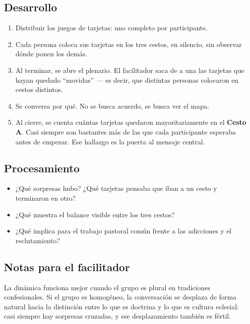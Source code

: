 \documentclass[11pt, a4paper]{article}
\begin{document}
\begin{actividad}
\subsection*{Desarrollo}
\begin{enumerate}[label={\arabic*.}]
  \item Distribuir los juegos de tarjetas: uno completo por participante.
  \item Cada persona coloca sus tarjetas en los tres cestos, en silencio, sin observar dónde ponen los demás.
  \item Al terminar, se abre el plenario. El facilitador saca de a una las tarjetas que hayan quedado ``movidas'' \emph{---} es decir, que distintas personas colocaron en cestos distintos.
  \item Se conversa por qué. No se busca acuerdo, se busca ver el mapa.
  \item Al cierre, se cuenta cuántas tarjetas quedaron mayoritariamente en el \textbf{Cesto A}. Casi siempre son bastantes más de las que cada participante esperaba antes de empezar. Ese hallazgo es la puerta al mensaje central.
\end{enumerate}

\subsection*{Procesamiento}
\begin{itemize}
  \item ¿Qué sorpresas hubo? ¿Qué tarjetas pensaba que iban a un cesto y terminaron en otro?
  \item ¿Qué muestra el balance visible entre los tres cestos?
  \item ¿Qué implica para el trabajo pastoral común frente a las adicciones y el reclutamiento?
\end{itemize}

\subsection*{Notas para el facilitador}
La dinámica funciona mejor cuando el grupo es plural en tradiciones confesionales. Si el grupo es homogéneo, la conversación se desplaza de forma natural hacia la distinción entre lo que es doctrina y lo que es cultura eclesial: casi siempre hay sorpresas cruzadas, y ese desplazamiento también es fértil.

\end{actividad}

\newpage
\end{document}

